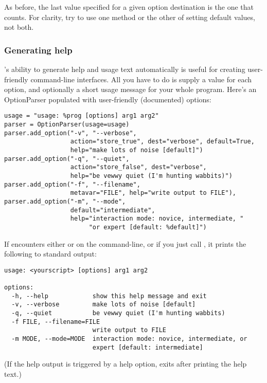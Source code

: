 As before, the last value specified for a given option destination is
the one that counts.  For clarity, try to use one method or the other of
setting default values, not both.


\subsubsection{Generating help\label{optparse-generating-help}}

's ability to generate help and usage text automatically is useful
for creating user-friendly command-line interfaces.  All you have to do
is supply a  value for each option, and optionally a short usage
message for your whole program.  Here's an OptionParser populated with
user-friendly (documented) options:
\begin{verbatim}
usage = "usage: %prog [options] arg1 arg2"
parser = OptionParser(usage=usage)
parser.add_option("-v", "--verbose",
                  action="store_true", dest="verbose", default=True,
                  help="make lots of noise [default]")
parser.add_option("-q", "--quiet",
                  action="store_false", dest="verbose", 
                  help="be vewwy quiet (I'm hunting wabbits)")
parser.add_option("-f", "--filename",
                  metavar="FILE", help="write output to FILE"),
parser.add_option("-m", "--mode",
                  default="intermediate",
                  help="interaction mode: novice, intermediate, "
                       "or expert [default: %default]")
\end{verbatim}

If  encounters either  or  on the command-line,
or if you just call , it prints the following to
standard output:
\begin{verbatim}
usage: <yourscript> [options] arg1 arg2

options:
  -h, --help            show this help message and exit
  -v, --verbose         make lots of noise [default]
  -q, --quiet           be vewwy quiet (I'm hunting wabbits)
  -f FILE, --filename=FILE
                        write output to FILE
  -m MODE, --mode=MODE  interaction mode: novice, intermediate, or
                        expert [default: intermediate]
\end{verbatim}

(If the help output is triggered by a help option,  exits after
printing the help text.)


